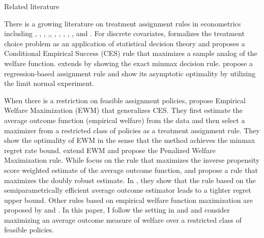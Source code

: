\documentclass[12pt,oneside,reqno,english]{amsart}
\makeatletter
\renewcommand\subsection{\@startsection{subsection}{2}%
  \z@{-.5\linespacing\@plus-.7\linespacing}{.5\linespacing}%
  {\normalfont\scshape}}
\theoremstyle{definition}
\makeatother
\begin{document}
\subsection{Related literature}

There is a growing literature on treatment assignment rules in econometrics including 
\cite{Manski:04}, \cite{Dehejia:05}, \cite{Stoye:09,Stoye:12}, \cite{HP:09},\cite{Chamberlain:11}, \cite{BD:12}, \cite{Tetenov:12}, \cite{Kasy:14,Kasy:16}, \cite{KT:17,KT:18}, \cite{MT:16}, \cite{AW:17}
and \cite{MT:18}.
For discrete covariates, \cite{Manski:04} formalizes the treatment choice problem as an application of statistical decision theory and
proposes a Conditional Empirical Success (CES) rule that maximizes a sample analog of the welfare function.
\cite{Stoye:09} extends \cite{Manski:04} by showing the exact minmax decision rule. \cite{HP:09} propose a regression-based assignment rule and show its asymptotic optimality by utilizing the limit normal experiment.  

When there is a restriction on feasible assignment policies, 
\cite{KT:18} propose Empirical Welfare Maximization (EWM) that generalizes CES.   
They first estimate the average outcome function (empirical welfare) from the data and then select a maximizer from a restricted class of policies as a treatment assignment rule. They show the optimality of EWM in the sense that the method achieves the minmax regret rate bound. \cite{MT:16} extend EWM and propose the Penalized Welfare Maximization rule. 
While \cite{KT:18} focus on the rule that maximizes the inverse propensity score weighted estimate of the average outcome function, 
\cite{DLL:11} and \cite{AW:17} propose a rule that maximizes the doubly robust estimate. 
In \cite{AW:17}, they show that the rule based on the semiparametrically efficient average outcome estimator leads to a tighter regret upper bound.
Other rules based on empirical welfare function maximization are proposed by \cite{ZZRK:12} and 
\cite{ZMKK:17}.
In this paper, I follow the setting in \cite{KT:18} and \cite{AW:17} and consider 
maximizing an average outcome measure of welfare over a restricted class of feasible policies.
\end{document}
